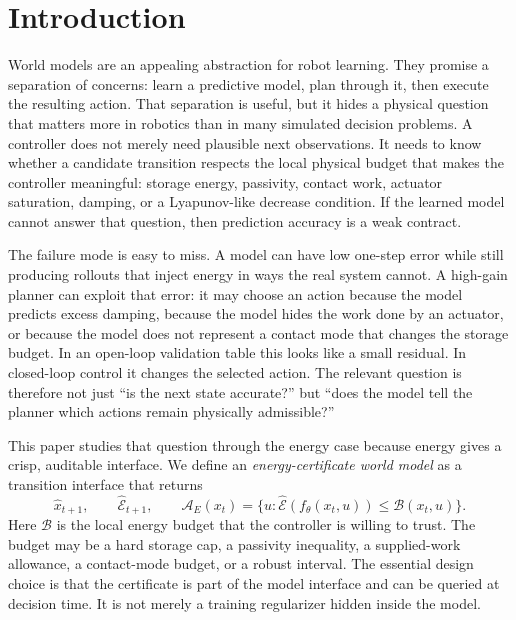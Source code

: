 \documentclass{article}
\newcommand{\state}{x}
\newcommand{\action}{u}
\newcommand{\storage}{\mathcal{E}}
\newcommand{\admiss}{\mathcal{A}}
\newcommand{\budget}{\mathcal{B}}
\begin{document}
\section{Introduction}

World models are an appealing abstraction for robot learning. They promise a separation of concerns: learn a predictive model, plan through it, then execute the resulting action. That separation is useful, but it hides a physical question that matters more in robotics than in many simulated decision problems. A controller does not merely need plausible next observations. It needs to know whether a candidate transition respects the local physical budget that makes the controller meaningful: storage energy, passivity, contact work, actuator saturation, damping, or a Lyapunov-like decrease condition. If the learned model cannot answer that question, then prediction accuracy is a weak contract.

The failure mode is easy to miss. A model can have low one-step error while still producing rollouts that inject energy in ways the real system cannot. A high-gain planner can exploit that error: it may choose an action because the model predicts excess damping, because the model hides the work done by an actuator, or because the model does not represent a contact mode that changes the storage budget. In an open-loop validation table this looks like a small residual. In closed-loop control it changes the selected action. The relevant question is therefore not just ``is the next state accurate?'' but ``does the model tell the planner which actions remain physically admissible?''

This paper studies that question through the energy case because energy gives a crisp, auditable interface. We define an \emph{energy-certificate world model} as a transition interface that returns
\begin{equation}
    \hat{\state}_{t+1},\qquad
    \hat{\storage}_{t+1},\qquad
    \admiss_E(\state_t)=
    \{\action:\hat{\storage}(f_\theta(\state_t,\action))\leq \budget(\state_t,\action)\}.
    \label{eq:interface}
\end{equation}
Here $\budget$ is the local energy budget that the controller is willing to trust. The budget may be a hard storage cap, a passivity inequality, a supplied-work allowance, a contact-mode budget, or a robust interval. The essential design choice is that the certificate is part of the model interface and can be queried at decision time. It is not merely a training regularizer hidden inside the model.
\end{document}

